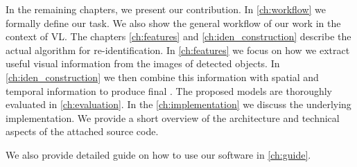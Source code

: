 In the remaining chapters, we present our contribution. In \autoref{ch:workflow} we formally define our task. We also show the general workflow of our work in the context of \gls{VL}. The chapters \ref{ch:features} and \ref{ch:iden_construction} describe the actual algorithm for re-identification. In \autoref{ch:features} we focus on how we extract useful visual information from the images of detected objects. In \autoref{ch:iden_construction} we then combine this information with spatial and temporal information to produce final \reid{}. The proposed models are thoroughly evaluated in \autoref{ch:evaluation}. In the \autoref{ch:implementation} we discuss the underlying implementation. We provide a short overview of the architecture and technical aspects of the attached source code.

We also provide detailed guide on how to use our software in \autoref{ch:guide}.